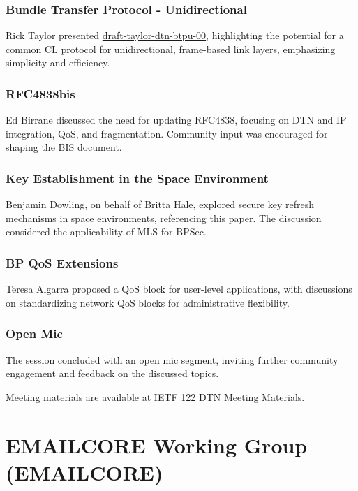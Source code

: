 \documentclass{article}
\begin{document}
\subsubsection{Bundle Transfer Protocol - Unidirectional}
Rick Taylor presented \href{https://datatracker.ietf.org/doc/html/draft-taylor-dtn-btpu-00}{draft-taylor-dtn-btpu-00}, highlighting the potential for a common CL protocol for unidirectional, frame-based link layers, emphasizing simplicity and efficiency.

\subsubsection{RFC4838bis}
Ed Birrane discussed the need for updating RFC4838, focusing on DTN and IP integration, QoS, and fragmentation. Community input was encouraged for shaping the BIS document.

\subsubsection{Key Establishment in the Space Environment}
Benjamin Dowling, on behalf of Britta Hale, explored secure key refresh mechanisms in space environments, referencing \href{https://arxiv.org/pdf/2503.06785}{this paper}. The discussion considered the applicability of MLS for BPSec.

\subsubsection{BP QoS Extensions}
Teresa Algarra proposed a QoS block for user-level applications, with discussions on standardizing network QoS blocks for administrative flexibility.

\subsubsection{Open Mic}
The session concluded with an open mic segment, inviting further community engagement and feedback on the discussed topics.

Meeting materials are available at \href{https://www.ietf.org/proceedings/122/dtn.html}{IETF 122 DTN Meeting Materials}.



\newpage

\section{EMAILCORE Working Group (EMAILCORE)}
\end{document}
